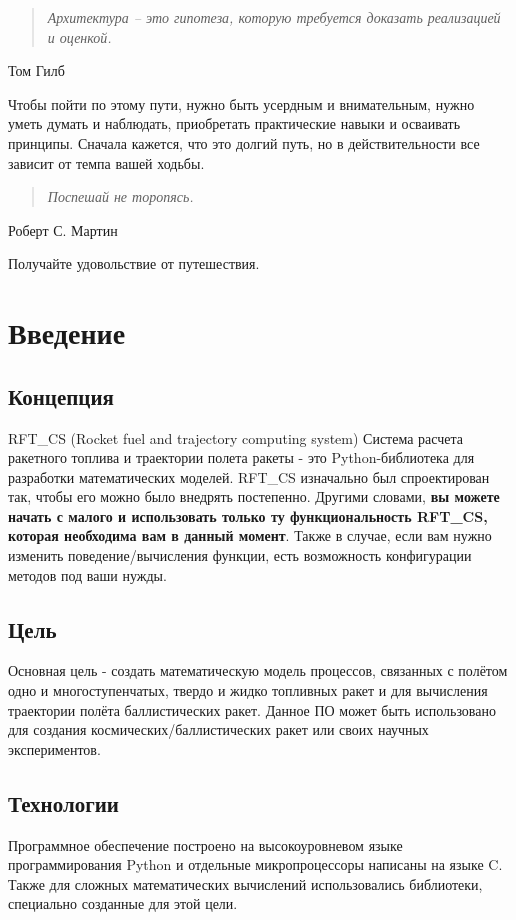 \documentclass[a4paper, 12pt]{report}
\begin{document}
{    \begin{quote}
        \textit{Архитектура – это гипотеза, которую требуется доказать реализацией и оценкой.}
    \end{quote}
    \begin{flushright}
        Том Гилб
    \end{flushright}
    Чтобы пойти по этому пути, нужно быть усердным и внимательным, нужно уметь думать и наблюдать, приобретать практические навыки и осваивать принципы. Сначала кажется, что это долгий путь, но в действительности все зависит от темпа вашей ходьбы.\\
    \begin{quote}
        \textit{Поспешай не торопясь.}
    \end{quote}
    \begin{flushright}
        Роберт С. Мартин
    \end{flushright}
    Получайте удовольствие от путешествия.
}

\chapter{Введение}
\section{Концепция}
\textrm{
    RFT\_CS (Rocket fuel and trajectory computing system) Система расчета ракетного топлива и траектории полета ракеты - это Python-библиотека для разработки математических моделей. RFT\_CS изначально был спроектирован так, чтобы его можно было внедрять постепенно. Другими словами, \textbf{вы можете начать с малого и использовать только ту функциональность RFT\_CS, которая необходима вам в данный момент}. Также в случае, если вам нужно изменить поведение/вычисления функции, есть возможность конфигурации методов под ваши нужды.
}
\section{Цель}
\textrm{
    Основная цель - создать математическую модель процессов, связанных с полётом одно и многоступенчатых, твердо и жидко топливных ракет и для вычисления траектории полёта баллистических ракет. Данное ПО может быть использовано для создания космических/баллистических ракет или своих научных экспериментов.
}
\section{Технологии}
\textrm{
    Программное обеспечение построено на высокоуровневом языке программирования Python и отдельные микропроцессоры написаны на языке C. Также для сложных математических вычислений использовались библиотеки, специально созданные для этой цели.
}
\clearpage
\end{document}
